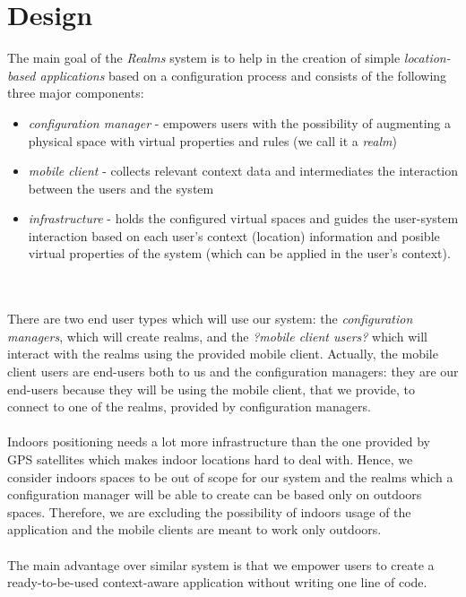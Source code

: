 \section{Design} %
\label{sec:design}
The main goal of the \emph{Realms} system is to help in the creation of simple \emph{location-based applications} based on a configuration process and consists of the following three major components:
\begin{itemize}
	\item \emph{configuration manager} - empowers users with the possibility of augmenting a physical space with virtual properties and rules (we call it a \emph{realm})
	\item \emph{mobile client} - collects relevant context data and intermediates the interaction between the users and the system
	\item \emph{infrastructure} - holds the configured virtual spaces and guides the user-system interaction based on each user's context (location) information and posible virtual properties of the system (which can be applied in the user's context).
\end{itemize}
\\\\
There are two end user types which will use our system: the \emph{configuration managers}, which will create realms, and the \emph{?mobile client users?} which will interact with the realms using the provided mobile client. Actually, the mobile client users are end-users both to us and the configuration managers: they are our end-users because they will be using the mobile client, that we provide, to connect to one of the realms, provided by configuration managers.
\\\\
Indoors positioning needs a lot more infrastructure than the one provided by GPS satellites which makes indoor locations hard to deal with. Hence, we consider indoors spaces to be out of scope for our system and the realms which a configuration manager will be able to create can be based only on outdoors spaces. Therefore, we are excluding the possibility of indoors usage of the application and the mobile clients are meant to work only outdoors.
\\\\
The main advantage over similar system is that we empower users to create a ready-to-be-used context-aware application without writing one line of code.\\
\\\\
